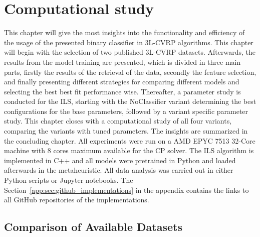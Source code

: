 \chapter{Computational study}
\label{chap:computational_study}
This chapter will give the most insights into the functionality and efficiency of the usage of the presented binary classifier in
\gls{3L-CVRP} algorithms. This chapter will begin with the selection of two published \gls{3L-CVRP} datasets.
Afterwards, the results from the model training are presented, which
is divided in three main parts, firstly the results of the retrieval of the data, secondly the feature selection, and finally presenting
different strategies for comparing different models and selecting the best best fit performance wise.
Thereafter, a parameter study is conducted for the \gls{ILS}, starting with the NoClassifier variant determining
the best configurations for the base parameters, followed by a variant specific parameter study.
This chapter closes with a computational study of all four variants, comparing the variants with tuned parameters.
The insights are summarized in the concluding chapter. All experiments were run on a AMD EPYC 7513 32-Core machine
with 8 cores maximum available for the \gls{CP} solver. The \gls{ILS} algorithm is implemented in C++ and all models
were pretrained in Python and loaded afterwards in the metaheuristic. All data analysis was carried out in either Python scripts
or Jupyter notebooks. The Section~\ref{app:sec:github_implementations} in the appendix contains the links to all GitHub repositories of the implementations.

\section{Comparison of Available Datasets}
\label{sec:dataset_comparison}

